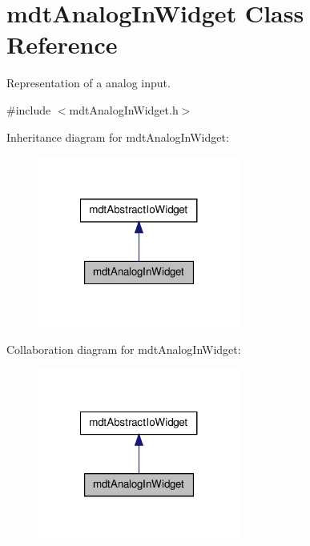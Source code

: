 \hypertarget{classmdt_analog_in_widget}{
\section{mdtAnalogInWidget Class Reference}
\label{classmdt_analog_in_widget}
}


Representation of a analog input.  




{\ttfamily \#include $<$mdtAnalogInWidget.h$>$}



Inheritance diagram for mdtAnalogInWidget:\nopagebreak
\begin{figure}[H]
\begin{center}
\leavevmode
\includegraphics[width=188pt]{classmdt_analog_in_widget__inherit__graph}
\end{center}
\end{figure}


Collaboration diagram for mdtAnalogInWidget:\nopagebreak
\begin{figure}[H]
\begin{center}
\leavevmode
\includegraphics[width=188pt]{classmdt_analog_in_widget__coll__graph}
\end{center}
\end{figure}

